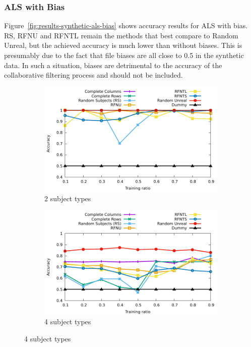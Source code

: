 \documentclass[10pt, conference, compsocconf]{IEEEtran}
\begin{document}
\subsubsection{ALS with Bias}

Figure~\ref{fig:results-synthetic-als-bias} shows accuracy results for 
ALS with bias. RS, RFNU and RFNTL remain the methods that best compare 
to Random Unreal, but the achieved accuracy is much lower than without 
biases. This is presumably due to 
the fact that file biases are all close to 0.5 in the synthetic data. 
In such a situation, biases are detrimental to the accuracy of the 
collaborative filtering process and should not be included.

\begin{figure}
\begin{subfigure}[b]{\columnwidth}
        \includegraphics[width=0.8\columnwidth]{data/results/means_of_results/ALS-Bias/Synthetic/synthetic_subject_types/ALS-Bias-2-types.pdf}
        \caption{2 subject types}
\end{subfigure}
\begin{subfigure}[b]{\columnwidth}
        \includegraphics[width=0.8\columnwidth]{data/results/means_of_results/ALS-Bias/Synthetic/synthetic_subject_types/ALS-Bias-4-types.pdf}
        \caption{4 subject types}
\end{subfigure}

\end{figure}
\end{document}
